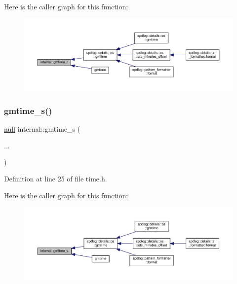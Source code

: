 Here is the caller graph for this function\+:
\nopagebreak
\begin{figure}[H]
\begin{center}
\leavevmode
\includegraphics[width=350pt]{namespaceinternal_a6a29b192fce543ff8c18fe7bedf3e321_icgraph}
\end{center}
\end{figure}
\mbox{\label{namespaceinternal_a4df52163db0eff7ab6b17cb243a224b7}} 
\subsubsection{\texorpdfstring{gmtime\+\_\+s()}{gmtime\_s()}}
{\footnotesize\ttfamily \hyperlink{structinternal_1_1null}{null} internal\+::gmtime\+\_\+s (\begin{DoxyParamCaption}\item[{}]{... }\end{DoxyParamCaption})\hspace{0.3cm}{\ttfamily [inline]}}



Definition at line 25 of file time.\+h.

Here is the caller graph for this function\+:
\nopagebreak
\begin{figure}[H]
\begin{center}
\leavevmode
\includegraphics[width=350pt]{namespaceinternal_a4df52163db0eff7ab6b17cb243a224b7_icgraph}
\end{center}
\end{figure}
\mbox{\label{namespaceinternal_a2cba199f690b1f46cbf62c8e9e2786bc}} 
